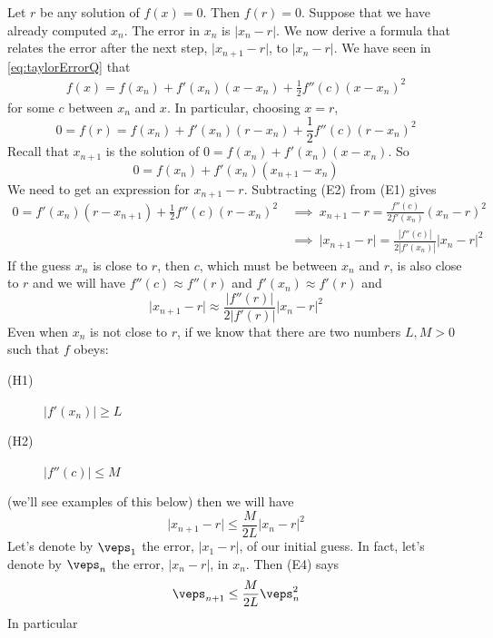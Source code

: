 Let $r$ be any solution of $f(x)=0$. Then $f(r)=0$. Suppose that we have
already computed $x_n$. The error in $x_n$ is $\big|x_n-r\big|$.
We now derive a formula that relates the error after the next step,
$\big|x_{n+1}-r\big|$, to $\big|x_n-r\big|$. We have seen in 
\eqref{eq:taylorErrorQ} that
\begin{align*}
f(x)=f(x_n)+f'(x_n)(x-x_n)+\frac{1}{2} f''(c)(x-x_n)^2
\end{align*}
for some $c$ between $x_n$ and $x$. In particular, choosing $x=r$,
\begin{equation*}
0=f(r)=f(x_n)+f'(x_n)(r-x_n)+\frac{1}{2} f''(c)(r-x_n)^2
\tag{E1}\end{equation*}
Recall that $x_{n+1}$ is the solution of $0=f(x_n)+f'(x_n)(x-x_n)$. So
\begin{equation*}
0=f(x_n)+f'(x_n)(x_{n+1}-x_n)
\tag{E2}\end{equation*}
We need to get an expression for $x_{n+1}-r$.
Subtracting (E2) from (E1) gives
\begin{align*}
0=f'(x_n)(r-x_{n+1})+\frac{1}{2} f''(c)(r-x_n)^2
\ &\implies\  x_{n+1}-r=\frac{f''(c)}{2f'(x_n)}(x_n-r)^2\\
&\implies\  \big|x_{n+1}-r\big| =\frac{|f''(c)|}{2|f'(x_n)|}|x_n-r|^2
\end{align*}
If the guess $x_n$ is close to $r$, then $c$, which must be between $x_n$
and $r$, is also close to $r$ and we will have $f''(c)\approx f''(r)$ 
and $f'(x_n)\approx f'(r)$ and
\begin{equation*}
\big|x_{n+1}-r\big| \approx\frac{|f''(r)|}{2|f'(r)|}|x_n-r|^2
\tag{E3}\end{equation*}
Even when $x_n$ is not close to $r$, if we know that there are two 
numbers $L,M>0$ such that $f$ obeys:
\begin{description}
\item[(H1)] $\big|f'(x_n)\big|\ge L$ 
\item[(H2)] $\big|f''(c)\big|\le M$
\end{description}
(we'll see examples of this below) then we will have
\begin{equation*}
 \big|x_{n+1}-r\big| \le\frac{M}{2L}|x_n-r|^2
\tag{E4}\end{equation*}
Let's denote by $\veps_1$ the error, $|x_1-r|$, of our initial guess. In
fact, let's denote  by $\veps_n$ the error, $|x_n-r|$, in $x_n$. Then 
(E4) says
\begin{equation*}
\veps_{n+1}\le \frac{M}{2L}\veps_n^2
\end{equation*}
In particular
